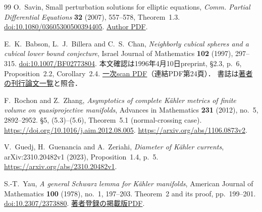 \begin{thebibliography}{99}
O.~Savin,
Small perturbation solutions for elliptic equations,
\emph{Comm. Partial Differential Equations} \textbf{32} (2007), 557--578,
Theorem~1.3.
\href{https://doi.org/10.1080/03605300500394405}{doi:10.1080/03605300500394405}.
\href{https://www.math.columbia.edu/~savin/Small_pert.pdf}{Author PDF}.

E.~K.~Babson, L.~J.~Billera and C.~S.~Chan,
\emph{Neighborly cubical spheres and a cubical lower bound conjecture},
Israel Journal of Mathematics \textbf{102} (1997), 297--315.
\href{https://doi.org/10.1007/BF02773804}{doi:10.1007/BF02773804}.
本文確認は1996年4月10日preprint, \S2.3, p.~6,
Proposition~2.2, Corollary~2.4.
\href{https://www.math.ucdavis.edu/~deloera/MISC/LA-BIBLIO/trunk/Billera/BilleraEhrenborgcdindex.pdf}{一次scan PDF}（連結PDF第24頁）．
書誌は\href{https://pi.math.cornell.edu/~billera/research.html}{著者の刊行論文一覧}と照合．

F.~Rochon and Z.~Zhang,
\emph{Asymptotics of complete K\"ahler metrics of finite volume on quasiprojective manifolds},
Advances in Mathematics \textbf{231} (2012), no.~5, 2892--2952.
\S5, (5.3)--(5.6), Theorem~5.1 (normal-crossing case).
\url{https://doi.org/10.1016/j.aim.2012.08.005}.
\url{https://arxiv.org/abs/1106.0873v2}.

V.~Guedj, H.~Guenancia and A.~Zeriahi,
\emph{Diameter of K\"ahler currents},
arXiv:2310.20482v1 (2023), Proposition~1.4, p.~5.
\url{https://arxiv.org/abs/2310.20482v1}.

S.-T.~Yau,
\emph{A general Schwarz lemma for K\"ahler manifolds},
American Journal of Mathematics \textbf{100} (1978), no.~1, 197--203.
Theorem~2 and its proof, pp.~199--201.
\href{https://doi.org/10.2307/2373880}{doi:10.2307/2373880}.
\href{https://archive.ymsc.tsinghua.edu.cn/pacm_download/59/11034-Shing-Tung_Yau_30.pdf}{著者登録の掲載版PDF}.

\end{thebibliography}
